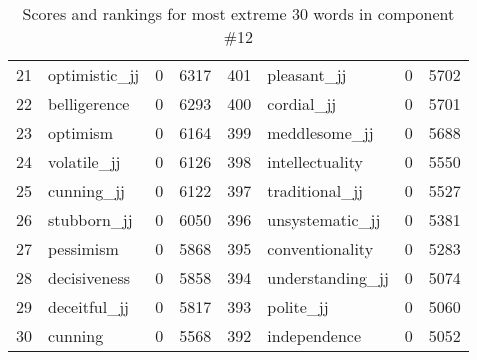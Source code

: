 \begin{table}[tbp]
\begin{tabular}{| rlr@{.}l | rlr@{.}l |}
    21 & optimistic\_jj & 0 & 6317    &    401 & pleasant\_jj & 0 & 5702 \\
    22 & belligerence & 0 & 6293    &    400 & cordial\_jj & 0 & 5701 \\
    23 & optimism & 0 & 6164    &    399 & meddlesome\_jj & 0 & 5688 \\
    24 & volatile\_jj & 0 & 6126    &    398 & intellectuality & 0 & 5550 \\
    25 & cunning\_jj & 0 & 6122    &    397 & traditional\_jj & 0 & 5527 \\
    26 & stubborn\_jj & 0 & 6050    &    396 & unsystematic\_jj & 0 & 5381 \\
    27 & pessimism & 0 & 5868    &    395 & conventionality & 0 & 5283 \\
    28 & decisiveness & 0 & 5858    &    394 & understanding\_jj & 0 & 5074 \\
    29 & deceitful\_jj & 0 & 5817    &    393 & polite\_jj & 0 & 5060 \\
    30 & cunning & 0 & 5568    &    392 & independence & 0 & 5052 \\
    \hline
    \end{tabular}
    \caption{Scores and rankings for most extreme 30 words in component \#12} 
\end{table}
\clearpage
